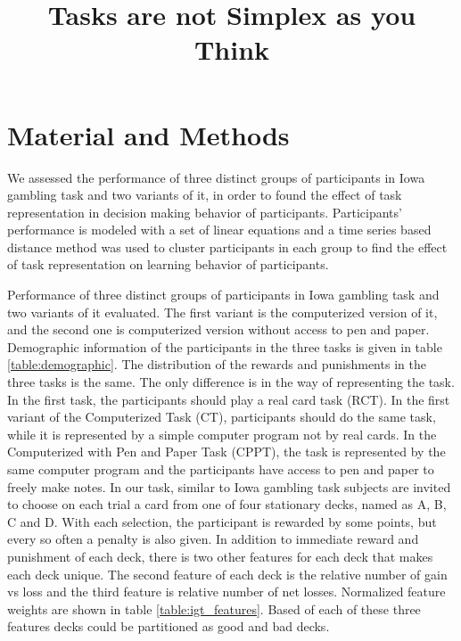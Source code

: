 \documentclass[12pt,twocolumn]{elsarticle}
\title{Tasks are not Simplex as you Think}
\author{}
\begin{document}
\maketitle

\section{Material and Methods}

We assessed the performance of three
distinct groups of participants in Iowa
gambling task and two variants of it, in
order to found the effect of task
representation in decision making
behavior of participants. Participants'
performance is modeled with a set of
linear equations and a time series based
distance method was used to cluster
participants in each group to find the
effect of task representation on
learning behavior of participants.


Performance of three distinct groups of
participants in Iowa gambling task and
two variants of it evaluated.  The first
variant is the computerized version of
it, and the second one is computerized
version without access to pen and paper.
Demographic information of the
participants in the three tasks is given
in table \ref{table:demographic}.
The distribution of the rewards and
punishments in the three tasks is the
same. The only difference is in the way
of representing the task.  In the first
task, the participants should play a
real card task (RCT). In the first
variant of the Computerized Task (CT),
participants should do the same task,
while it is represented by a simple
computer program not by real cards. In
the Computerized with Pen and Paper Task
(CPPT), the task is represented by the
same computer program and the
participants have access to pen and
paper to freely make notes.  In our
task, similar to Iowa gambling task
subjects are invited to choose on each
trial a card from one of four stationary
decks, named as A, B, C and D. With each
selection, the participant is rewarded
by some points, but every so often a
penalty is also given. In addition to
immediate reward and punishment of each
deck, there is two other features for
each deck that makes each deck unique.
The second feature of each deck is the
relative number of gain vs loss and the
third feature is relative number of net
losses.  Normalized feature weights are
shown in table \ref{table:igt_features}.
Based of each of these three features
decks could be partitioned as
good and bad decks.
\end{document}
